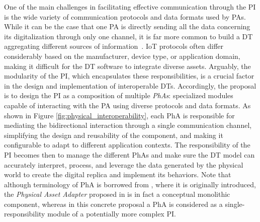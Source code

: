 One of the main challenges in facilitating effective communication through the \ac{PI} is the wide variety of communication protocols and data formats used by \acp{PA}.
%
While it can be the case that one \ac{PA} is directly sending all the data concerning its digitalization through only one channel,
it is far more common to build a \ac{DT} aggregating different sources of information~\cite{qi2018dt-and-bigdata}.
%
\ac{IoT} protocols often differ considerably based on the manufacturer, device type, or application domain, making it difficult for the \ac{DT} software to integrate diverse assets.
%
Arguably, the modularity of the \ac{PI}, which encapsulates these responsibilities, is a crucial factor in the design and implementation of interoperable \acp{DT}.
%
Accordingly, the proposal is to design the \ac{PI} as a composition of multiple \emph{\acp{PhA}}: specialized modules capable of interacting with the \ac{PA} using diverse protocols and data formats.
%
As shown in Figure \ref{fig:physical_interoperability}, each \ac{PhA} is responsible for mediating the bidirectional interaction through a single communication channel, simplifying the design and reusability of the component, and making it configurable to adapt to different application contexts.
%
The responsibility of the \ac{PI} becomes then to manage the different \acp{PhA} and make sure the \ac{DT} model can accurately interpret, process, and leverage the data generated by the physical world to create the digital replica and implement its behaviors.
%
Note that although terminology of \ac{PhA} is borrowed from \cite{web-of-dt-ricci-2022}, where it is originally introduced, the \emph{Physical Asset Adapter} proposed in \cite{web-of-dt-ricci-2022} is in fact a conceptual monolithic component, whereas in this concrete proposal a \ac{PhA} is considered as a single-responsibility module of a potentially more complex \ac{PI}.

